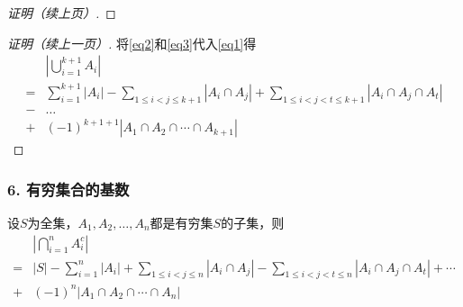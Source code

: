 \documentclass{beamer}
\begin{document}
\begin{CJK*}{UTF8}{gbsn}
\begin{frame}
\begin{proof}[证明（续上页）]
\end{proof}
\end{frame}
\begin{frame}
  \begin{proof}[证明（续上一页）]
将\eqref{eq2}和\eqref{eq3}代入\eqref{eq1}得
  \begin{equation*}
    \begin{split}
    &|\bigcup_{i=1}^{k+1}A_i|\\
=&\sum_{i=1}^{k+1}|A_i| - \sum_{1\leq i < j \leq {k+1}}|A_i \cap A_j| + \sum_{1 \leq  i < j < t \leq {k+1}}|A_i \cap A_j \cap A_t|\\
-&\ldots\\
+&(-1)^{k+1+1}|A_1 \cap A_2 \cap \cdots \cap A_{k+1}|
\end{split}
\end{equation*}

  \end{proof}
\end{frame}

\begin{frame}
\frametitle{6. 有穷集合的基数}
\begin{Thm}
  设$S$为全集，$A_1, A_2, \ldots, A_n$都是有穷集$S$的子集，则
  \begin{equation*}
    \begin{split}
      &|\bigcap_{i=1}^nA_{i}^c|\\
=&|S| - \sum_{i=1}^n|A_i| + \sum_{1\leq i < j \leq n}|A_i \cap A_j|
-\sum_{1 \leq  i < j < t \leq n}|A_i \cap A_j \cap A_t| + \cdots \\
+&(-1)^n|A_1 \cap A_2 \cap \cdots \cap A_n|
    \end{split}
  \end{equation*}
\end{Thm}
\end{frame}


\end{CJK*}
\end{document}

